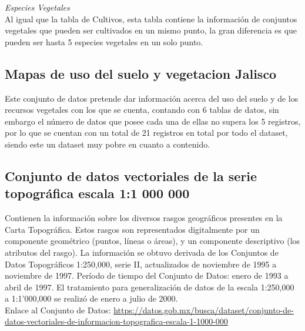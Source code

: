 \documentclass[10pt,letterpaper]{article}
\begin{document}
\textit{Especies Vegetales}\\
Al igual que la tabla de Cultivos, esta tabla contiene la informaci\'on de conjuntos vegetales que pueden ser cultivados en un mismo punto, la gran diferencia es que pueden ser hasta 5 especies vegetales en un solo punto.

\subsection{Mapas de uso del suelo y vegetacion Jalisco}

Este conjunto de datos pretende dar informaci\'on acerca del uso del suelo y de los recursos vegetales con los que se cuenta, contando con 6 tablas de datos, sin embargo el n\'umero de datos que posee cada una de ellas no supera los 5 registros, por lo que se cuentan con un total de 21 registros en total por todo el dataset, siendo este un dataset muy pobre en cuanto a contenido.

%
%

\subsection{Conjunto de datos vectoriales de la serie topogr\'afica escala 1:1 000 000}

Contienen la informaci\'on sobre los diversos rasgos geogr\'aficos presentes en la Carta Topogr\'afica. Estos rasgos son representados digitalmente por un componente geom\'etrico (puntos, l\'ineas o \'areas), y un componente descriptivo (los atributos del rasgo). La informaci\'on se obtuvo derivada de los Conjuntos de Datos Topogr\'aficos 1:250,000, serie II, actualizados de noviembre de 1995 a noviembre de 1997. Per\'iodo de tiempo del Conjunto de Datos: enero de 1993 a abril de 1997. El tratamiento para generalizaci\'on de datos de la escala 1:250,000 a 1:1'000,000 se realiz\'o de enero a julio de 2000.\\

Enlace al Conjunto de Datos: 
\url{https://datos.gob.mx/busca/dataset/conjunto-de-datos-vectoriales-de-informacion-topografica-escala-1-1000-000}
\end{document}
